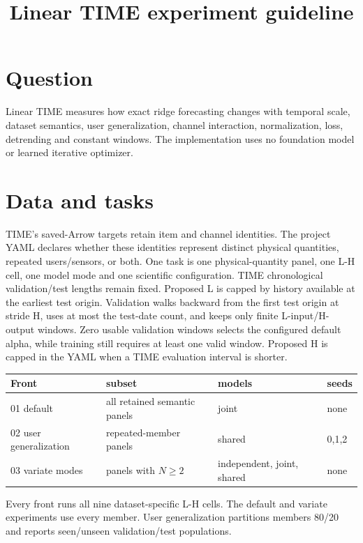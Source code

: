 \documentclass[11pt]{article}
\title{Linear TIME experiment guideline}
\author{}\date{}
\begin{document}
\maketitle\footnotesize

\section{Question}
Linear TIME measures how exact ridge forecasting changes with temporal scale,
dataset semantics, user generalization, channel interaction, normalization,
loss, detrending and constant windows. The implementation uses no foundation
model or learned iterative optimizer.

\section{Data and tasks}
TIME's saved-Arrow targets retain item and channel identities. The project YAML
declares whether these identities represent distinct physical quantities,
repeated users/sensors, or both. One task is one physical-quantity panel, one
L-H cell, one model mode and one scientific configuration. TIME chronological
validation/test lengths remain fixed. Proposed L is capped by history available
at the earliest test origin. Validation walks backward from the first test
origin at stride H, uses at most the test-date count, and keeps only finite
L-input/H-output windows. Zero usable validation windows selects the configured
default alpha, while training still requires at least one valid window.
Proposed H is capped in the YAML when a TIME evaluation
interval is shorter.

\begin{center}\begin{tabular}{llll}\toprule
Front & subset & models & seeds\\\midrule
01 default & all retained semantic panels & joint & none\\
02 user generalization & repeated-member panels & shared & 0,1,2\\
03 variate modes & panels with $N\ge2$ & independent, joint, shared & none\\
\bottomrule\end{tabular}\end{center}
Every front runs all nine dataset-specific L-H cells. The default and variate
experiments use every member. User generalization partitions members 80/20 and
reports seen/unseen validation/test populations.
\end{document}
